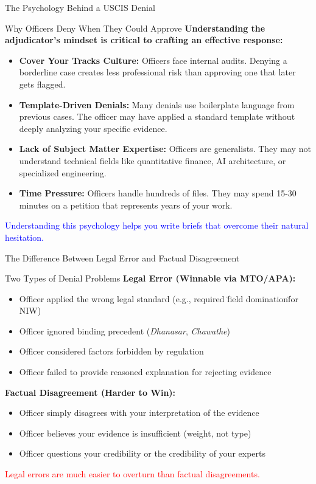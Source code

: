 \documentclass[11pt]{beamer}
\begin{document}
	\begin{frame}{The Psychology Behind a USCIS Denial}
		\scriptsize
		\begin{block}{Why Officers Deny When They Could Approve}
			\textbf{Understanding the adjudicator's mindset is critical to crafting an effective response:}
			\vspace{0.1cm}
			\begin{itemize}
				\item \textbf{Cover Your Tracks Culture:} Officers face internal audits. Denying a borderline case creates less professional risk than approving one that later gets flagged.
				\item \textbf{Template-Driven Denials:} Many denials use boilerplate language from previous cases. The officer may have applied a standard template without deeply analyzing your specific evidence.
				\item \textbf{Lack of Subject Matter Expertise:} Officers are generalists. They may not understand technical fields like quantitative finance, AI architecture, or specialized engineering.
				\item \textbf{Time Pressure:} Officers handle hundreds of files. They may spend 15-30 minutes on a petition that represents years of your work.
			\end{itemize}
			\textcolor{blue}{Understanding this psychology helps you write briefs that overcome their natural hesitation.}
		\end{block}
	\end{frame}
	
	\begin{frame}{The Difference Between Legal Error and Factual Disagreement}
		\scriptsize
		\begin{block}{Two Types of Denial Problems}
			\textbf{Legal Error (Winnable via MTO/APA):}
			\begin{itemize}
				\item Officer applied the wrong legal standard (e.g., required \"field domination\" for NIW)
				\item Officer ignored binding precedent (\textit{Dhanasar}, \textit{Chawathe})
				\item Officer considered factors forbidden by regulation
				\item Officer failed to provide reasoned explanation for rejecting evidence
			\end{itemize}
			\textbf{Factual Disagreement (Harder to Win):}
			\begin{itemize}
				\item Officer simply disagrees with your interpretation of the evidence
				\item Officer believes your evidence is insufficient (weight, not type)
				\item Officer questions your credibility or the credibility of your experts
			\end{itemize}
			\textcolor{red}{Legal errors are much easier to overturn than factual disagreements.}
		\end{block}
	\end{frame}
	
\end{document}
